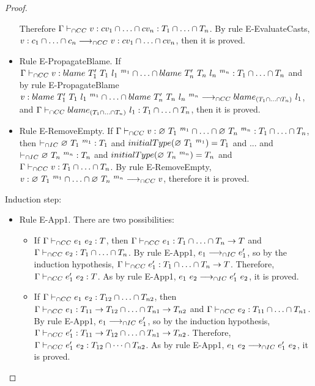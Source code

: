 \documentclass[a4paper]{article}
\begin{document}
\begin{proof}
\begin{itemize}
    Therefore $\Gamma \vdash_{\cap CC} v : cv_1 \cap \ldots \cap cv_n : T_1 \cap \ldots \cap T_n$.
    By rule E-EvaluateCasts, $v : c_1 \cap \ldots \cap c_n \longrightarrow_{\cap CC} v : cv_1 \cap \ldots \cap cv_n$, then it is proved.
    \item Rule E-PropagateBlame.
    If $\Gamma \vdash_{\cap CC} v : blame\ T_1'\ T_1\ l_1\ ^{m_1} \cap \ldots \cap blame\ T_n'\ T_n\ l_n\ ^{m_n} : T_1 \cap \ldots \cap T_n$ and by rule E-PropagateBlame $v : blame\ T_1'\ T_1\ l_1\ ^{m_1} \cap \ldots \cap blame\ T_n'\ T_n\ l_n\ ^{m_n} \longrightarrow_{\cap CC} blame_{(T_1 \cap \ldots \cap T_n)}\ l_1$, and $\Gamma \vdash_{\cap CC} blame_{(T_1 \cap \ldots \cap T_n)}\ l_1 : T_1 \cap \ldots \cap T_n$, then it is proved.
    \item Rule E-RemoveEmpty.
    If $\Gamma \vdash_{\cap CC} v : \varnothing\ T_1\ ^{m_1} \cap \ldots \cap \varnothing\ T_n\ ^{m_n} : T_1 \cap \ldots \cap T_n$, then $\vdash_{\cap IC} \varnothing\ T_1\ ^{m_1} : T_1$ and $initialType(\varnothing\ T_1\ ^{m_1}) = T_1$ and ... and $\vdash_{\cap IC} \varnothing\ T_n\ ^{m_n} : T_n$ and $initialType(\varnothing\ T_n\ ^{m_n}) = T_n$ and $\Gamma \vdash_{\cap CC} v : T_1 \cap \ldots \cap T_n$.
    By rule E-RemoveEmpty, $v : \varnothing\ T_1\ ^{m_1} \cap \ldots \cap \varnothing\ T_n\ ^{m_n} \longrightarrow_{\cap CC} v$, therefore it is proved.
\end{itemize}
Induction step:
\begin{itemize}
    \item Rule E-App1. There are two possibilities:
    \begin{itemize}
        \item If $\Gamma \vdash_{\cap CC} e_1\ e_2 : T$, then $\Gamma \vdash_{\cap CC} e_1 : T_1 \cap \ldots \cap T_n \rightarrow T$ and $\Gamma \vdash_{\cap CC} e_2 : T_1 \cap \ldots \cap T_n$.
        By rule E-App1, $e_1 \longrightarrow_{\cap IC} e_1'$, so by the induction hypothesis, $\Gamma \vdash_{\cap CC} e_1' : T_1 \cap \ldots \cap T_n \rightarrow T$.
        Therefore, $\Gamma \vdash_{\cap CC} e_1'\ e_2 : T$.
        As by rule E-App1, $e_1\ e_2 \longrightarrow_{\cap IC} e_1'\ e_2$, it is proved.
        \item If $\Gamma \vdash_{\cap CC} e_1\ e_2 : T_{12} \cap \ldots \cap T_{n2}$, then $\Gamma \vdash_{\cap CC} e_1 : T_{11} \rightarrow T_{12} \cap \ldots \cap T_{n1} \rightarrow T_{n2}$ and $\Gamma \vdash_{\cap CC} e_2 : T_{11} \cap \ldots \cap T_{n1}$.
        By rule E-App1, $e_1 \longrightarrow_{\cap IC} e_1'$, so by the induction hypothesis, $\Gamma \vdash_{\cap CC} e_1' : T_{11} \rightarrow T_{12} \cap \ldots \cap T_{n1} \rightarrow T_{n2}$.
        Therefore, $\Gamma \vdash_{\cap CC} e_1'\ e_2 : T_{12} \cap \dots \cap T_{n2}$.
        As by rule E-App1, $e_1\ e_2 \longrightarrow_{\cap IC} e_1'\ e_2$, it is proved.
    \end{itemize}

\end{itemize}
\end{proof}
\end{document}
